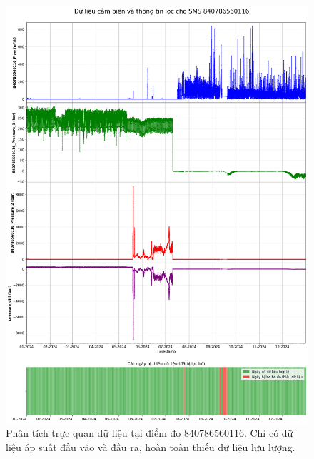 \begin{figure}[H]
    \centering
    \includegraphics[width=\textwidth]{image/section6_1/timeseries_combined_840786560116.png}
    \caption{Phân tích trực quan dữ liệu tại điểm đo 840786560116. Chỉ có dữ liệu áp suất đầu vào và đầu ra, hoàn toàn thiếu dữ liệu lưu lượng.}
    \label{fig:no_flow_data_841210802047}
\end{figure}


